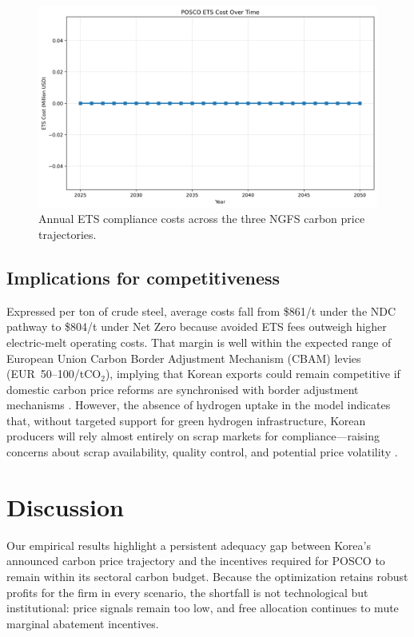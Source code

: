 \documentclass[preprint,1p,authoryear]{elsarticle}
\begin{document}
\begin{figure}[!t]
  \centering
  \includegraphics[width=0.8\linewidth]{ets_cost_by_scenario}
  \caption{Annual ETS compliance costs across the three NGFS carbon price trajectories.}
  \label{fig:ets-costs}
\end{figure}

\subsection{Implications for competitiveness}

Expressed per ton of crude steel, average costs fall from \$861/t under the NDC pathway to \$804/t under Net Zero because avoided ETS fees outweigh higher electric-melt operating costs. That margin is well within the expected range of European Union Carbon Border Adjustment Mechanism (CBAM) levies (EUR~50--100/tCO$_2$), implying that Korean exports could remain competitive if domestic carbon price reforms are synchronised with border adjustment mechanisms \citep{Vogl2018}. However, the absence of hydrogen uptake in the model indicates that, without targeted support for green hydrogen infrastructure, Korean producers will rely almost entirely on scrap markets for compliance—raising concerns about scrap availability, quality control, and potential price volatility \citep{Griffin2020}.

\section{Discussion}

Our empirical results highlight a persistent adequacy gap between Korea's announced carbon price trajectory and the incentives required for POSCO to remain within its sectoral carbon budget. Because the optimization retains robust profits for the firm in every scenario, the shortfall is not technological but institutional: price signals remain too low, and free allocation continues to mute marginal abatement incentives.
\end{document}
